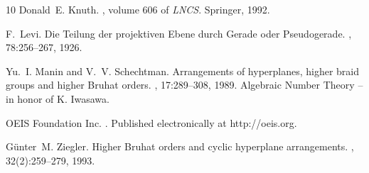 \documentclass[a4paper,11pt]{amsart}
\begin{document}
\begin{thebibliography}{10}
Donald~E. Knuth.
, volume 606 of {\em LNCS}.
\newblock Springer, 1992.

F.~Levi.
\newblock Die {Teilung} der projektiven {Ebene} durch {Gerade} oder
  {Pseudogerade}.
, 78:256--267,
  1926.

Yu.~I. Manin and V.~V. Schechtman.
\newblock Arrangements of hyperplanes, higher braid groups and higher {B}ruhat
  orders.
, 17:289--308, 1989.
\newblock Algebraic Number Theory -- in honor of K. Iwasawa.

{OEIS Foundation Inc.}
.
\newblock Published electronically at http://oeis.org.

G{\"u}nter~M. Ziegler.
\newblock Higher {B}ruhat orders and cyclic hyperplane arrangements.
, 32(2):259--279, 1993.

\end{thebibliography}
\end{document}
